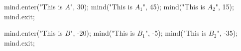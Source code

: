 \usemodule[mindmap]
\startMPpage
mind.enter("This is $A$", 30);
    mind("This is $A_1$", 45);
    mind("This is $A_2$", 15);
mind.exit;

mind.enter("This is $B$", -20);
    mind("This is $B_1$", -5);
    mind("This is $B_2$", -35);
mind.exit;
\stopMPpage
